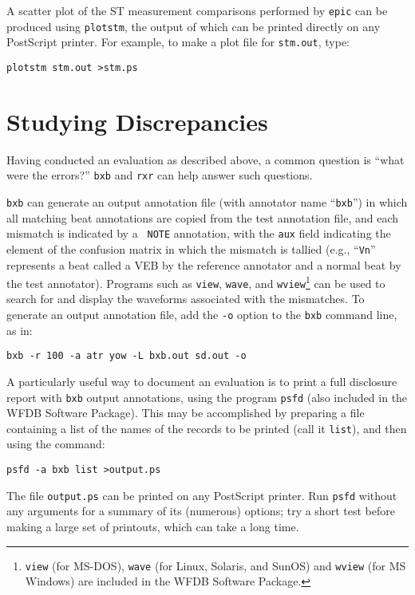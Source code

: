 \documentclass[twoside]{article}
\begin{document}
A scatter plot of the ST measurement comparisons performed by {\tt epic} can be
produced using {\tt plotstm}, the output of which can be printed directly on
any PostScript printer.  For example, to make a plot file for {\tt stm.out},
type:
\begin{verbatim}
plotstm stm.out >stm.ps
\end{verbatim}

\section{Studying Discrepancies}

Having conducted an evaluation as described above, a common question
is ``what were the errors?''  {\tt bxb} and {\tt rxr} can help
answer such questions.

{\tt bxb} can generate an output annotation file (with annotator name
``{\tt bxb}'') in which all matching beat annotations are copied from
the test annotation file, and each mismatch is indicated by a {\tt
NOTE} annotation, with the {\tt aux} field indicating the element of
the confusion matrix in which the mismatch is tallied (e.g., ``{\tt Vn}''
represents a beat called a VEB by the reference annotator and a normal
beat by the test annotator).  Programs such as {\tt view},
{\tt wave}, and {\tt wview}\footnote{
{\tt view} (for MS-DOS),  {\tt wave} (for Linux, Solaris, and SunOS) and
{\tt wview} (for MS Windows) are included in the WFDB Software Package.}
can be used to search for and display the waveforms associated with the
mismatches.  To generate an output annotation file, add the {\tt -o} option to
the {\tt bxb} command line, as in:
\begin{verbatim}
bxb -r 100 -a atr yow -L bxb.out sd.out -o
\end{verbatim}
A particularly useful way to document an evaluation is to print a
full disclosure report with {\tt bxb} output annotations, using the
program {\tt psfd} (also included in the WFDB Software Package).  This may
be accomplished by preparing a file containing a list of the names of
the records to be printed (call it {\tt list}), and then using the
command:
\begin{verbatim}
psfd -a bxb list >output.ps
\end{verbatim}
The file {\tt output.ps} can be printed on any PostScript printer.
Run {\tt psfd} without any arguments for a summary of its (numerous)
options;  try a short test before making a large set of printouts,
which can take a long time.
\end{document}
